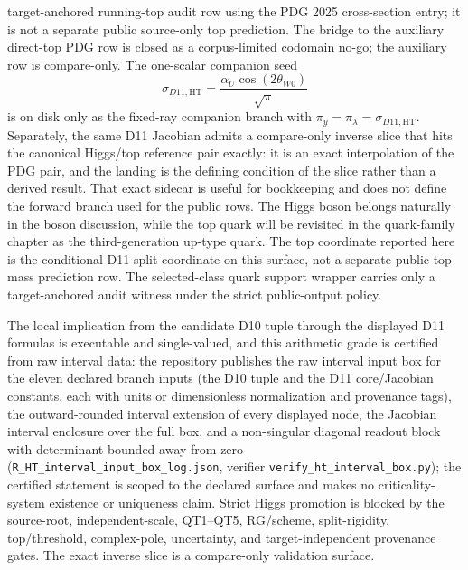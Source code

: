 \documentclass[11pt]{article}
\begin{document}
target-anchored running-top audit row using the PDG 2025 cross-section entry; it is not a separate
public source-only top prediction. The bridge to the auxiliary direct-top PDG row is closed as a
corpus-limited codomain no-go; the auxiliary row is compare-only.
The one-scalar companion seed
\[
\sigma_{D11,\mathrm{HT}}=\frac{\alpha_U\cos(2\theta_{W0})}{\sqrt{\pi}}
\]
is on disk only as the fixed-ray companion branch with \(\pi_y=\pi_\lambda=\sigma_{D11,\mathrm{HT}}\).
Separately, the same D11 Jacobian admits a compare-only inverse slice that hits the canonical
Higgs/top reference pair exactly: it is an exact interpolation of the PDG pair, and the landing
is the defining condition of the slice rather than a derived result. That exact sidecar is
useful for bookkeeping and does not define
the forward branch used for the public rows.
The Higgs boson belongs naturally in the boson discussion, while the top quark will be revisited
in the quark-family chapter as the third-generation up-type quark. The top coordinate reported
here is the conditional D11 split coordinate on this surface, not a separate public top-mass prediction
row. The selected-class quark support wrapper carries only a target-anchored audit witness under
the strict public-output policy.

The local implication from the candidate D10 tuple through the displayed D11
formulas is executable and single-valued, and this arithmetic grade is
certified from raw interval data: the repository publishes the raw interval
input box for the eleven declared branch inputs (the D10 tuple and the D11
core/Jacobian constants, each with units or dimensionless normalization and
provenance tags), the outward-rounded interval extension of every displayed
node, the Jacobian interval enclosure over the full box, and a non-singular
diagonal readout block with determinant bounded away from zero
(\texttt{R\_HT\_interval\_input\_box\_log.json}, verifier
\texttt{verify\_ht\_interval\_box.py}); the certified statement is scoped to
the declared surface and makes no criticality-system existence or uniqueness
claim. Strict Higgs promotion is
blocked by the source-root, independent-scale, QT1--QT5, RG/scheme,
split-rigidity, top/threshold, complex-pole, uncertainty, and target-independent
provenance gates.  The exact inverse slice is a compare-only validation
surface.
\end{document}
